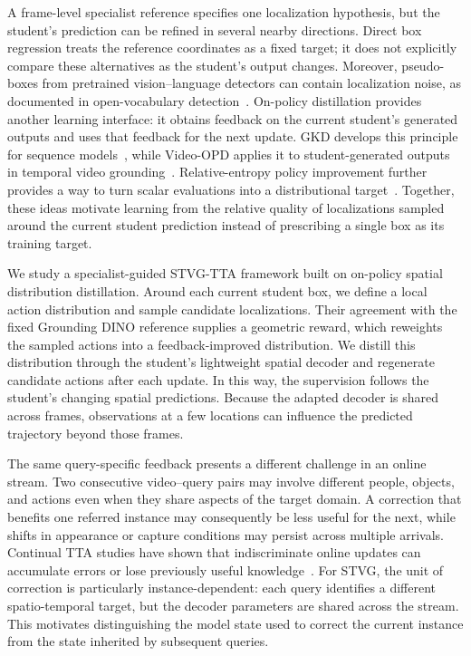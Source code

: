 \documentclass[10pt,twocolumn,letterpaper]{article}
\begin{document}
A frame-level specialist reference specifies one localization
hypothesis, but the student's prediction can be refined in several
nearby directions. Direct box regression treats the reference
coordinates as a fixed target; it does not explicitly compare these
alternatives as the student's output changes. Moreover, pseudo-boxes
from pretrained vision--language detectors can contain localization
noise, as documented in open-vocabulary detection~\cite{sasdet}.
On-policy distillation provides another learning interface: it
obtains feedback on the current student's generated outputs and uses
that feedback for the next update. GKD develops this principle for
sequence models~\cite{gkd}, while Video-OPD applies it to
student-generated outputs in temporal video grounding~\cite{videoopd}.
Relative-entropy policy improvement further provides a way to turn
scalar evaluations into a distributional target~\cite{reps,mpo}.
Together, these ideas motivate learning from the relative quality of
localizations sampled around the current student prediction instead
of prescribing a single box as its training target.

We study a specialist-guided
STVG-TTA framework built on on-policy spatial distribution
distillation. Around each current student box, we define a local
action distribution and sample candidate localizations. Their
agreement with the fixed Grounding DINO reference supplies a
geometric reward, which reweights the sampled actions into a
feedback-improved distribution. We distill this distribution through
the student's lightweight spatial decoder and regenerate candidate
actions after each update. In this way, the supervision follows the
student's changing spatial predictions. Because the adapted decoder
is shared across frames, observations at a few locations can
influence the predicted trajectory beyond those frames.

The same query-specific feedback presents a different challenge in an
online stream. Two consecutive video--query pairs may involve
different people, objects, and actions even when they share aspects of
the target domain. A correction that benefits one referred instance
may consequently be less useful for the next, while shifts in
appearance or capture conditions may persist across multiple
arrivals. Continual TTA studies have shown that indiscriminate online
updates can accumulate errors or lose previously useful
knowledge~\cite{cotta,rotta}. For STVG, the unit of correction is
particularly instance-dependent: each query identifies a different
spatio-temporal target, but the decoder parameters are shared across
the stream. This motivates distinguishing the model state used to
correct the current instance from the state inherited by subsequent
queries.
\end{document}

